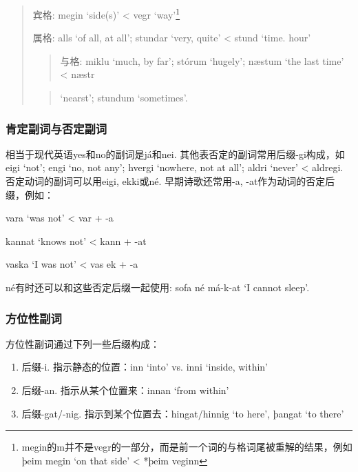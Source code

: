 \begin{quote}
宾格: megin `side(s)‌' \textless{} vegr `way‌'\footnote{megin的m并不是vegr的一部分，而是前一个词的与格词尾被重解的结果，例如þeim
  megin `on that side' \textless{} *þeim veginn}

属格: alls `of all, at all‌'; stundar `very, quite‌' \textless{} stund
`time. hour'

\begin{quote}
与格: miklu `much, by far‌'; stórum `hugely‌'; næstum `the last time‌'
\textless{} næstr
\end{quote}

\begin{quote}
`nearst'; stundum `sometimes‌'.
\end{quote}
\end{quote}

\subsubsection{肯定副词与否定副词}\label{肯定副词与否定副词}

相当于现代英语yes和no的副词是já和nei.
其他表否定的副词常用后缀-gi构成，如eigi `not‌'; engi `no, not any‌';
hvergi `nowhere, not at all‌'; aldri `never‌' \textless{} aldregi.
否定动词的副词可以用eigi, ekki或né. 早期诗歌还常用-a,
-at作为动词的否定后缀，例如：

vara `was not' \textless{} var + -a

kannat `knows not' \textless{} kann + -at

vaska `I was not‌' \textless{} vas ek + -a

né有时还可以和这些否定后缀一起使用: sofa né má-k-at `I cannot sleep‌'.

\subsubsection{方位性副词}\label{方位性副词}

方位性副词通过下列一些后缀构成：

\begin{enumerate}
\def\labelenumi{\arabic{enumi})}
\item
  后缀-i. 指示静态的位置：inn `into‌' vs. inni `inside, within‌'
\item
  后缀-an. 指示从某个位置来：innan `from within‌'
\item
  后缀-gat/-nig. 指示到某个位置去：hingat/hinnig `to here‌', þangat `to
  there‌'
\end{enumerate}

